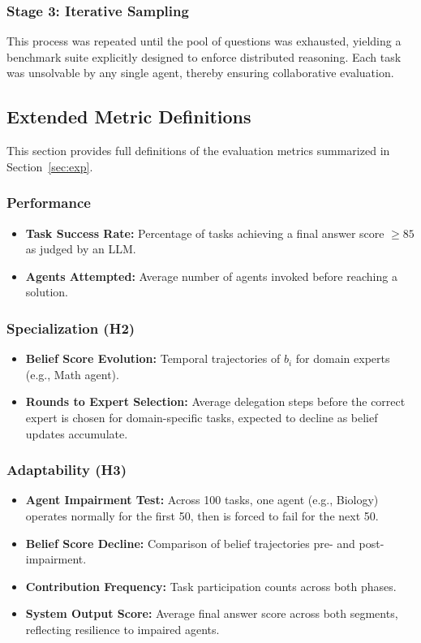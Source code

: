 \subsubsection{Stage 3: Iterative Sampling}
This process was repeated until the pool of questions was exhausted, yielding a benchmark suite explicitly designed to enforce distributed reasoning. Each task was unsolvable by any single agent, thereby ensuring collaborative evaluation.


\subsection{Extended Metric Definitions}
This section provides full definitions of the evaluation metrics summarized in Section~\ref{sec:exp}.

\subsubsection{Performance}
\begin{itemize}
    \item \textbf{Task Success Rate:} Percentage of tasks achieving a final answer score $\geq 85$ as judged by an LLM.
    \item \textbf{Agents Attempted:} Average number of agents invoked before reaching a solution.
\end{itemize}

\subsubsection{Specialization (H2)}
\begin{itemize}
    \item \textbf{Belief Score Evolution:} Temporal trajectories of $b_i$ for domain experts (e.g., Math agent).
    \item \textbf{Rounds to Expert Selection:} Average delegation steps before the correct expert is chosen for domain-specific tasks, expected to decline as belief updates accumulate.
\end{itemize}

\subsubsection{Adaptability (H3)}
\begin{itemize}
    \item \textbf{Agent Impairment Test:} Across 100 tasks, one agent (e.g., Biology) operates normally for the first 50, then is forced to fail for the next 50.
    \item \textbf{Belief Score Decline:} Comparison of belief trajectories pre- and post-impairment.
    \item \textbf{Contribution Frequency:} Task participation counts across both phases.
    \item \textbf{System Output Score:} Average final answer score across both segments, reflecting resilience to impaired agents.
\end{itemize}


